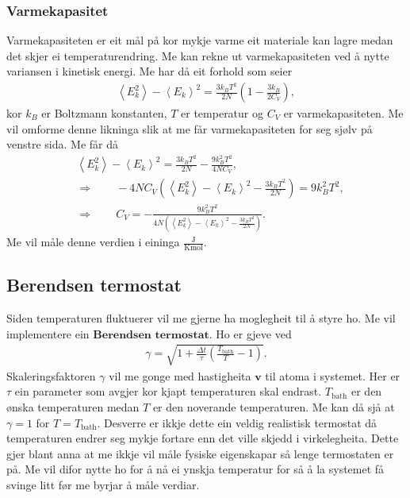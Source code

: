 \documentclass[12pt, a4paper]{article}
\theoremstyle{definition}
\newcommand{\vb}{\mathbf}
\newcommand{\lla}{\left \langle}
\newcommand{\rra}{\right \rangle}
\begin{document}
        \subsubsection*{Varmekapasitet}
            Varmekapasiteten er eit mål på kor mykje varme eit materiale kan lagre medan det skjer ei temperaturendring. Me kan rekne ut varmekapasiteten ved å nytte variansen 
            i kinetisk energi. Me har då eit forhold som seier
            \begin{align*}
                \lla E_k^2 \rra - \lla E_k \rra^2 = \frac{3k_BT^2}{2N}\left( 1 - \frac{3k_B}{2C_V} \right),
            \end{align*}
            kor $k_B$ er Boltzmann konstanten, $T$ er temperatur og $C_V$ er varmekapasiteten. Me vil omforme denne likninga slik at me får varmekapasiteten for seg sjølv på 
            venstre sida. Me får då
            \begin{align*}
                &\lla E_k^2 \rra - \lla E_k \rra^2 = \frac{3k_BT^2}{2N} - \frac{9k_B^2T^2}{4NC_V}, \\
                &\Rightarrow \qquad -4NC_V\left( \lla E_k^2 \rra - \lla E_k \rra^2 -\frac{3k_BT^2}{2N}\right) = 9k_B^2T^2, \\
                &\Rightarrow \qquad C_V = -\frac{9k_B^2T^2}{4N\left( \lla E_k^2 \rra - \lla E_k \rra^2 -\frac{3k_BT^2}{2N}\right)}.
            \end{align*}
            Me vil måle denne verdien i eininga $\frac{\text{J}}{\text{Kmol}}$.


    \subsection*{Berendsen termostat}
        Siden temperaturen fluktuerer vil me gjerne ha moglegheit til å styre ho. Me vil implementere ein $\textbf{Berendsen termostat}$. Ho er gjeve ved 
        \begin{align*}
            \gamma = \sqrt{1 + \frac{\Delta t}{\tau}\left( \frac{T_{\text{bath}}}{T} - 1 \right)}.
        \end{align*}
        Skaleringsfaktoren $\gamma$ vil me gonge med hastigheita $\vb{v}$ til atoma i systemet. Her er $\tau$ ein parameter som avgjer kor kjapt temperaturen skal endrast.
        $T_{\text{bath}}$ er den ønska temperaturen medan $T$ er den noverande temperaturen. Me kan då sjå at $\gamma = 1$ for $T = T_{\text{bath}}$. Desverre er ikkje dette
        ein veldig realistisk termostat då temperaturen endrer seg mykje fortare enn det ville skjedd i virkelegheita. Dette gjer blant anna at me ikkje vil måle fysiske eigenskapar
        så lenge termostaten er på. Me vil difor nytte ho for å nå ei ynskja temperatur for så å la systemet få svinge litt før me byrjar å måle verdiar.
\end{document}
